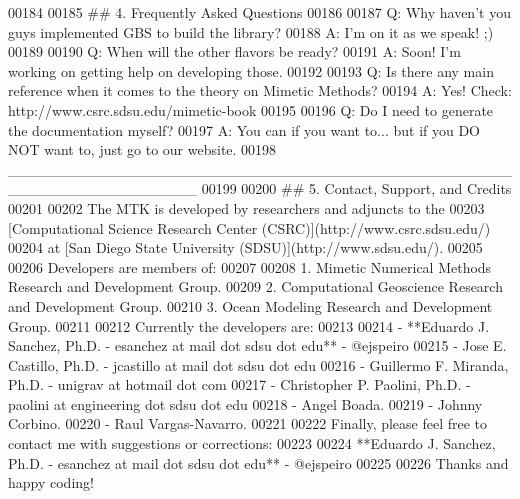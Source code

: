 \begin{DoxyCode}
00184 \textcolor{stringliteral}{}
00185 \textcolor{stringliteral}{## 4. Frequently Asked Questions}
00186 \textcolor{stringliteral}{}
00187 \textcolor{stringliteral}{Q: Why haven'}t you guys implemented GBS to build the library?
00188 A: I\textcolor{stringliteral}{'m on it as we speak! ;)}
00189 \textcolor{stringliteral}{}
00190 \textcolor{stringliteral}{Q: When will the other flavors be ready?}
00191 \textcolor{stringliteral}{A: Soon! I'}m working on getting help on developing those.
00192 
00193 Q: Is there any main reference when it comes to the theory on Mimetic Methods?
00194 A: Yes! Check: http:\textcolor{comment}{//www.csrc.sdsu.edu/mimetic-book}
00195 
00196 Q: Do I need to generate the documentation myself?
00197 A: You can if you want to... but if you DO NOT want to, just go to our website.
00198     \_\_\_\_\_\_\_\_\_\_\_\_\_\_\_\_\_\_\_\_\_\_\_\_\_\_\_\_\_\_\_\_\_\_\_\_\_\_\_\_\_\_\_\_\_\_\_\_\_\_\_\_\_\_\_\_\_\_\_\_\_\_\_\_\_\_
00199 
00200 ## 5. Contact, Support, and Credits
00201 
00202 The MTK is developed by researchers and adjuncts to the
00203 [Computational Science Research Center (CSRC)](http:\textcolor{comment}{//www.csrc.sdsu.edu/)}
00204 at [San Diego State University (SDSU)](http:\textcolor{comment}{//www.sdsu.edu/).}
00205 
00206 Developers are members of:
00207 
00208 1. Mimetic Numerical Methods Research and Development Group.
00209 2. Computational Geoscience Research and Development Group.
00210 3. Ocean Modeling Research and Development Group.
00211 
00212 Currently the developers are:
00213 
00214 - **Eduardo J. Sanchez, Ph.D. - esanchez at mail dot sdsu dot edu** - @ejspeiro
00215 - Jose E. Castillo, Ph.D. - jcastillo at mail dot sdsu dot edu
00216 - Guillermo F. Miranda, Ph.D. - unigrav at hotmail dot com
00217 - Christopher P. Paolini, Ph.D. - paolini at engineering dot sdsu dot edu
00218 - Angel Boada.
00219 - Johnny Corbino.
00220 - Raul Vargas-Navarro.
00221 
00222 Finally, please feel free to contact me with suggestions or corrections:
00223 
00224 **Eduardo J. Sanchez, Ph.D. - esanchez at mail dot sdsu dot edu** - @ejspeiro
00225 
00226 Thanks and happy coding!
\end{DoxyCode}
